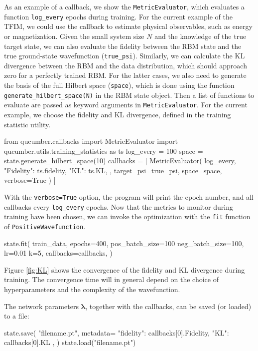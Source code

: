 \documentclass[submission, Phys, hidelinks]{SciPost}
\begin{document}
		As an example of a callback, we show the \verb|MetricEvaluator|, which evaluates a function \verb|log_every| epochs during training. For the current example of the TFIM, we could use the callback to estimate physical observables, such as energy or magnetization. Given the small system size $N$ and the knowledge of the true target state, we can also evaluate the fidelity between the RBM state and the true ground-state wavefunction (\verb|true_psi|). Similarly, we can calculate the KL divergence between the RBM and the data distribution, which should approach zero for a perfectly trained RBM. For the latter cases, we also need to generate the basis of the full Hilbert space (\verb|space|), which is done using the function \verb|generate_hilbert_space(N)| in the RBM state object. Then a list of functions to evaluate are passed as keyword arguments in \verb|MetricEvaluator|. For the current example, we choose the fidelity and KL divergence, defined in the training statistic utility.
\begin{python}
from qucumber.callbacks import MetricEvaluator
import qucumber.utils.training_statistics as ts
log_every = 100
space = state.generate_hilbert_space(10)
callbacks = [
	MetricEvaluator(
		log_every,
		{
		"Fidelity": ts.fidelity, 
		"KL": ts.KL, 
		},
	target_psi=true_psi,
	space=space,
	verbose=True
	)
]
\end{python}
		With the \verb|verbose=True| option, the program will print the epoch number, and all callbacks every \verb|log_every| epochs. Now that the metrics to monitor during training have been chosen, we can invoke the optimization with the \verb|fit| function of \verb|PositiveWavefunction|.
\begin{python}
state.fit(
	train_data,
	epochs=400,
	pos_batch_size=100
	neg_batch_size=100,
	lr=0.01
	k=5,
	callbacks=callbacks,
)
\end{python}
		Figure \ref{fig:KL} shows the convergence of the fidelity and KL divergence during training. The convergence time will in general depend on the choice of hyperparameters and the complexity of the wavefunction.
		
		The network parameters $\bm{\lambda}$, together with the callbacks, can be saved (or loaded) to a file:
\begin{python}
state.save(
	"filename.pt",
	metadata={
		"fidelity": callbacks[0].Fidelity,
		"KL": callbacks[0].KL
	},
)
state.load("filename.pt")
\end{python}
\end{document}

